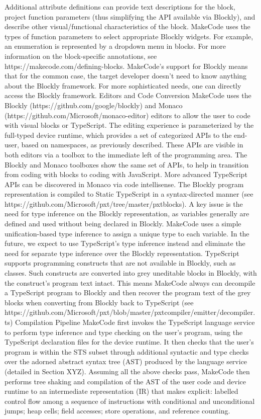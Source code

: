 {Additional attribute definitions can provide text descriptions for the block, project function parameters (thus simplifying the API available via Blockly), and describe other visual/functional characteristics of the block.  MakeCode uses the types of function parameters to select appropriate Blockly widgets.  For example, an enumeration is represented by a dropdown menu in blocks.
For more information on the block-specific annotations, see https://makecode.com/defining-blocks.  MakeCode’s support for Blockly means that for the common case, the target developer doesn’t need to know anything about the Blockly framework.  For more sophisticated needs, one can directly access the Blockly framework. 
Editors and Code Conversion
MakeCode uses the Blockly (https://github.com/google/blockly) and Monaco (https://github.com/Microsoft/monaco-editor) editors to allow the user to code with visual blocks or TypeScript. The editing experience is parameterized by the full-typed device runtime, which provides a set of categorized APIs to the end-user, based on namespaces, as previously described. These APIs are visible in both editors via a toolbox to the immediate left of the programming area. The Blockly and Monaco toolboxes show the same set of APIs, to help in transition from coding with blocks to coding with JavaScript. More advanced TypeScript APIs can be discovered in Monaco via code intellisense.
The Blockly program representation is compiled to Static TypeScript in a syntax-directed manner (see https://github.com/Microsoft/pxt/tree/master/pxtblocks). A key issue is the need for type inference on the Blockly representation, as variables generally are defined and used without being declared in Blockly. MakeCode uses a simple unification-based type inference to assign a unique type to each variable.  In the future, we expect to use TypeScript’s type inference instead and eliminate the need for separate type inference over the Blockly representation. 
TypeScript supports programming constructs that are not available in Blockly, such as classes. Such constructs are converted into grey uneditable blocks in Blockly, with the construct’s program text intact. This means MakeCode always can decompile a TypeScript program to Blockly and then recover the program text of the grey blocks when converting from Blockly back to TypeScript (see https://github.com/Microsoft/pxt/blob/master/pxtcompiler/emitter/decompiler.ts) 
Compilation Pipeline
MakeCode first invokes the TypeScript language service to perform type inference and type checking on the user’s program, using the TypeScript declaration files for the device runtime.   It then checks that the user’s program is within the STS subset through additional syntactic and type checks over the adorned abstract syntax tree (AST) produced by the language service (detailed in Section XYZ).  Assuming all the above checks pass, MakeCode then performs tree shaking and compilation of the AST of the user code and device runtime to an intermediate representation (IR) that makes explicit: labelled control flow among a sequence of instructions with conditional and unconditional jumps; heap cells; field accesses; store operations, and reference counting.
}
